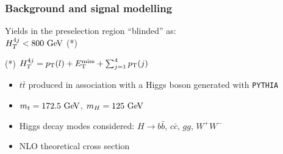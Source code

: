\begin{frame}\frametitle{Background and signal modelling}
\centering\myskip

\begin{minipage}{.5\textwidth}\footnotesize\centering
\scriptsize
Yields in the preselection region ``blinded'' as:\\
$\htfj<800\gev$ (*)
\myskip

  

\myskip
(*) $\htfj = \pT(l) + \met + \sum_{j = 1}^{\rm 4}\pT(j)$
\end{minipage}\begin{minipage}{.5\textwidth}\footnotesize\centering

\begin{itemize}
\item $t\bar{t}$ produced in association with a Higgs boson generated with {\tt PYTHIA}
\item $m_t = 172.5\gev$, $m_H=125\gev$
\item Higgs decay modes considered: $H\to b\bar{b}$, $c\bar{c}$, $gg$, $W^+W^-$
\item NLO theoretical cross section
\end{itemize}

\end{minipage}
\end{frame}


